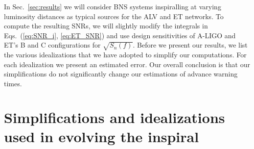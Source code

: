 \documentclass[prd,amsmath,amssymb,aps,floats,amsfonts,notitlepage,superscriptaddress,eqsecnum,nofootinbib,10pt]{revtex4-1}
\begin{document}
In Sec.~\ref{sec:results} we will consider BNS systems inspiralling at varying luminosity distances as typical sources for the ALV and ET networks.
To compute the resulting SNRs, we will slightly modify the integrals in Eqs.~(\ref{eq:SNR_i}, \ref{eq:ET_SNR}) and 
use design sensitivities of A-LIGO and ET's B and C configurations for $\sqrt{S_n(f)}$.
Before we present our results, we list the various idealizations that we have adopted to simplify our computations.
For each idealization we present an estimated error. %
Our overall conclusion is that our simplifications do not significantly change our estimations of advance warning times.%
%
%
%
%
\section{Simplifications and idealizations used in evolving the inspiral}\label{sec:idealizations}
\end{document}
